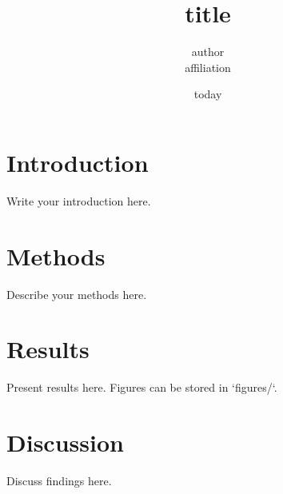 \documentclass[12pt,letterpaper]{article}
\title{ {{ title }} }
\author{ {{ author }} \\ {{ affiliation }} }
\date{ {{ today }} }
\begin{document}
\maketitle

\section{Introduction}
Write your introduction here.

\section{Methods}
Describe your methods here.

\section{Results}
Present results here. Figures can be stored in `figures/`.

\section{Discussion}
Discuss findings here.



\end{document}
